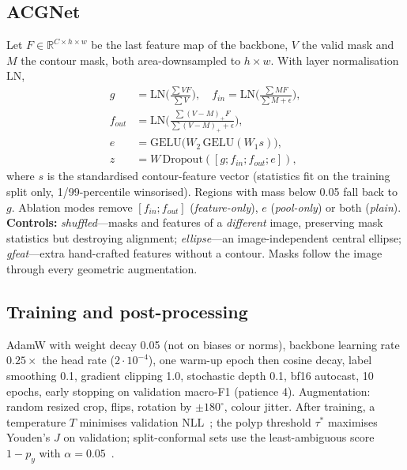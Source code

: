 \subsection{ACGNet}\label{sec:acg}
Let $F\in\mathbb{R}^{C\times h\times w}$ be the last feature map of the backbone, $V$ the valid mask and $M$ the contour mask,
both area-downsampled to $h{\times}w$. With layer normalisation $\mathrm{LN}$,
\begin{align}
g &= \mathrm{LN}\!\Big(\tfrac{\sum V F}{\sum V}\Big), \quad
f_{in} = \mathrm{LN}\!\Big(\tfrac{\sum M F}{\sum M+\epsilon}\Big),\\
f_{out} &= \mathrm{LN}\!\Big(\tfrac{\sum (V-M)_+ F}{\sum (V-M)_+ +\epsilon}\Big),\\
e &= \mathrm{GELU}\big(W_2\,\mathrm{GELU}(W_1 s)\big),\\
z &= W\,\mathrm{Dropout}([g;f_{in};f_{out};e]),
\end{align}
where $s$ is the standardised contour-feature vector (statistics fit on the training split only, 1/99-percentile winsorised).
Regions with mass below 0.05 fall back to $g$. Ablation modes remove $[f_{in};f_{out}]$ (\emph{feature-only}), $e$
(\emph{pool-only}) or both (\emph{plain}). \textbf{Controls:} \emph{shuffled}---masks and features of a
\emph{different} image, preserving mask statistics but destroying alignment; \emph{ellipse}---an image-independent
central ellipse; \emph{gfeat}---extra hand-crafted features without a contour.
Masks follow the image through every geometric augmentation.

\subsection{Training and post-processing}
AdamW with weight decay 0.05 (not on biases or norms), backbone learning rate $0.25\times$ the head rate ($2{\cdot}10^{-4}$),
one warm-up epoch then cosine decay, label smoothing 0.1, gradient clipping 1.0, stochastic depth 0.1, bf16 autocast,
10 epochs, early stopping on validation macro-F1 (patience 4). Augmentation: random resized crop, flips, rotation by $\pm180^\circ$, colour jitter.
After training, a temperature $T$ minimises validation NLL~\cite{guo2017calibration}; the polyp threshold $\tau^\ast$
maximises Youden's $J$ on validation; split-conformal sets use the least-ambiguous score $1-p_y$ with $\alpha=0.05$~\cite{angelopoulos2023conformal}.
